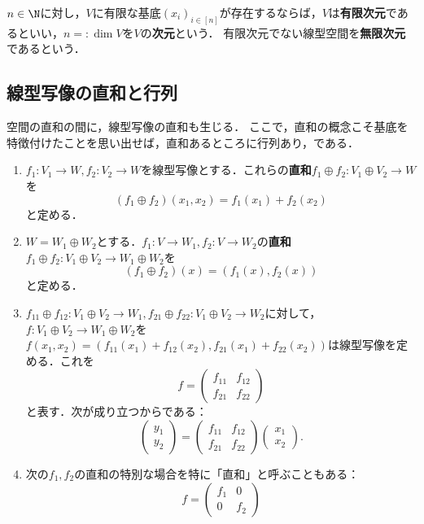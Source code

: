 \documentclass[uplatex, dvipdfmx]{jsreport}
\begin{document}
\begin{definition}\label{def-dimention}
    $n\in\N$に対し，$V$に有限な基底$(x_i)_{i\in[n]}$が存在するならば，$V$は\textbf{有限次元}であるといい，$n=:\dim V$を$V$の\textbf{次元}という．
    有限次元でない線型空間を\textbf{無限次元}であるという．
\end{definition}

\subsection{線型写像の直和と行列}

\begin{tcolorbox}[colframe=ForestGreen, colback=ForestGreen!10!white,breakable,colbacktitle=ForestGreen!40!white,coltitle=black,fonttitle=\bfseries\sffamily,
title=]
    空間の直和の間に，線型写像の直和も生じる．
    ここで，直和の概念こそ基底を特徴付けたことを思い出せば，直和あるところに行列あり，である．
\end{tcolorbox}

\begin{definition}[線型写像の直和]\mbox{}
    \begin{enumerate}
        \item $f_1:V_1\to W,f_2:V_2\to W$を線型写像とする．これらの\textbf{直和}$f_1\oplus f_2:V_1\oplus V_2\to W$を
        \[(f_1\oplus f_2)(x_1,x_2)=f_1(x_1)+f_2(x_2)\]
        と定める．
        \item $W=W_1\oplus W_2$とする．$f_1:V\to W_1,f_2:V\to W_2$の\textbf{直和}$f_1\oplus f_2:V_1\oplus V_2\to W_1\oplus W_2$を
        \[(f_1\oplus f_2)(x)=(f_1(x),f_2(x))\]
        と定める．
        \item $f_{11}\oplus f_{12}:V_1\oplus V_2\to W_1,f_{21}\oplus f_{22}:V_1\oplus V_2\to W_2$に対して，$f:V_1\oplus V_2\to W_1\oplus W_2$を$f(x_1,x_2)=(f_{11}(x_1)+f_{12}(x_2),f_{21}(x_1)+f_{22}(x_2))$は線型写像を定める．これを
        \[ f=\begin{pmatrix}f_{11}&f_{12}\\f_{21}&f_{22}\end{pmatrix} \]
        と表す．次が成り立つからである：
        \[ \begin{pmatrix}y_1\\y_2\end{pmatrix}=\begin{pmatrix}f_{11}&f_{12}\\f_{21}&f_{22}\end{pmatrix}\begin{pmatrix}x_1\\x_2\end{pmatrix}. \]
        \item 次の$f_1,f_2$の直和の特別な場合を特に「直和」と呼ぶこともある：
        \[ f=\begin{pmatrix}f_{1}&0\\0&f_{2}\end{pmatrix} \]
    \end{enumerate}
\end{definition}
\end{document}
